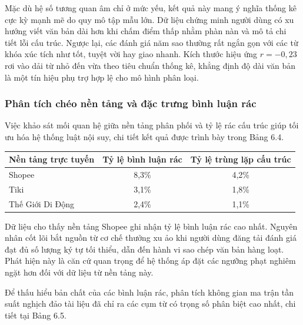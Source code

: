 Mặc dù hệ số tương quan âm chỉ ở mức yếu, kết quả này mang ý nghĩa thống kê cực kỳ mạnh mẽ do quy mô tập mẫu lớn. Dữ liệu chứng minh người dùng có xu hướng viết văn bản dài hơn khi chấm điểm thấp nhằm phàn nàn và mô tả chi tiết lỗi cấu trúc. Ngược lại, các đánh giá năm sao thường rất ngắn gọn với các từ khóa xúc tích như tốt, tuyệt vời hay giao nhanh. Kích thước hiệu ứng $r = -0{,}23$ rơi vào dải từ nhỏ đến vừa theo tiêu chuẩn thống kê, khẳng định độ dài văn bản là một tín hiệu phụ trợ hợp lệ cho mô hình phân loại.

\subsubsection{Phân tích chéo nền tảng và đặc trưng bình luận rác}

Việc khảo sát mối quan hệ giữa nền tảng phân phối và tỷ lệ rác cấu trúc giúp tối ưu hóa hệ thống luật nội suy, chi tiết kết quả được trình bày trong Bảng 6.4.

\begin{center}
\renewcommand{\arraystretch}{1.4}
\begin{tabularx}{\textwidth}{|l|c|c|}
\hline
\rowcolor[HTML]{E8E8E8}
\textbf{Nền tảng trực tuyến} & \textbf{Tỷ lệ bình luận rác} & \textbf{Tỷ lệ trùng lặp cấu trúc} \\
\hline
Shopee & 8,3\% & 4,2\% \\
\hline
Tiki & 3,1\% & 1,8\% \\
\hline
Thế Giới Di Động & 2,4\% & 1,1\% \\
\hline
\end{tabularx}
\end{center}

Dữ liệu cho thấy nền tảng Shopee ghi nhận tỷ lệ bình luận rác cao nhất. Nguyên nhân cốt lõi bắt nguồn từ cơ chế thưởng xu ảo khi người dùng đăng tải đánh giá đạt đủ số lượng ký tự tối thiểu, dẫn đến hành vi sao chép văn bản hàng loạt. Phát hiện này là căn cứ quan trọng để hệ thống áp đặt các ngưỡng phạt nghiêm ngặt hơn đối với dữ liệu từ nền tảng này.

Để thấu hiểu bản chất của các bình luận rác, phân tích không gian ma trận tần suất nghịch đảo tài liệu đã chỉ ra các cụm từ có trọng số phân biệt cao nhất, chi tiết tại Bảng 6.5.

